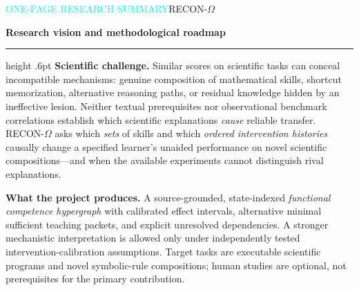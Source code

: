 \documentclass[11pt,a4paper]{article}
\theoremstyle{definition}\newtheorem{definition}[theorem]{Definition}
\theoremstyle{remark}\newtheorem{remark}[theorem]{Remark}
\begin{document}
\clearpage
\thispagestyle{fancy}
{\sffamily\small\textcolor{aqua}{ONE-PAGE RESEARCH SUMMARY}\hfill RECON-$\Omega$\\[4pt]}
{\fontsize{18}{22}\selectfont\bfseries Research vision and methodological roadmap\par}
\vspace{2mm}\hrule height .6pt\vspace{3mm}
\begingroup\small\setlength{\parskip}{3pt}
\textbf{Scientific challenge.} Similar scores on scientific tasks can conceal incompatible mechanisms: genuine composition of mathematical skills, shortcut memorization, alternative reasoning paths, or residual knowledge hidden by an ineffective lesion. Neither textual prerequisites nor observational benchmark correlations establish which scientific explanations \emph{cause} reliable transfer. RECON-$\Omega$ asks which \emph{sets} of skills and which \emph{ordered intervention histories} causally change a specified learner's unaided performance on novel scientific compositions---and when the available experiments cannot distinguish rival explanations.

\textbf{What the project produces.} A source-grounded, state-indexed \emph{functional competence hypergraph} with calibrated effect intervals, alternative minimal sufficient teaching packets, and explicit unresolved dependencies. A stronger mechanistic interpretation is allowed only under independently tested intervention-calibration assumptions. Target tasks are executable scientific programs and novel symbolic-rule compositions; human studies are optional, not prerequisites for the primary contribution.
\end{document}
